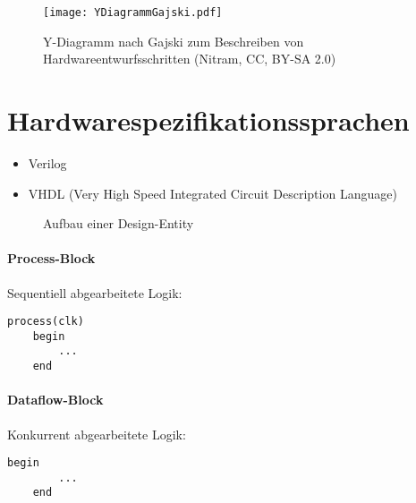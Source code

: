 \begin{figure}[H]
    \centering
    \texttt{[image: YDiagrammGajski.pdf]}
    \caption{Y-Diagramm nach Gajski zum Beschreiben von Hardwareentwurfsschritten (Nitram, CC, BY-SA 2.0)}
\end{figure}

\section{Hardwarespezifikationssprachen}
\begin{itemize}
    \item Verilog
    \item VHDL (Very High Speed Integrated Circuit Description Language)
\end{itemize}

\begin{figure}[H]
    \centering
    \caption{Aufbau einer Design-Entity}
\end{figure}

\paragraph{Process-Block}
Sequentiell abgearbeitete Logik:
\begin{lstlisting}[style=vhdl]
    process(clk)
    begin
        ...
    end
\end{lstlisting}

\paragraph{Dataflow-Block}
Konkurrent abgearbeitete Logik:
\begin{lstlisting}[style=vhdl]
    begin
        ...
    end
\end{lstlisting}

